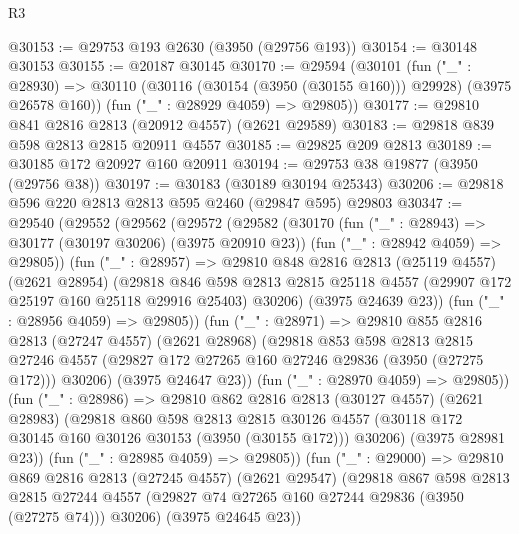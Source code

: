 \begin{lexlean}{R3}
\begin{coremodule}
@30153 := @29753 @193 @2630 (@3950 (@29756 @193))
@30154 := @30148 @30153
@30155 := @20187 @30145
@30170 := @29594
    (@30101
      (fun ("_" : @28930) =>
      @30110 (@30116 (@30154 (@3950 (@30155 @160))) @29928) (@3975 @26578 @160))
      (fun ("_" : @28929 @4059) => @29805))
@30177 := @29810 @841 @2816 @2813 (@20912 @4557) (@2621 @29589)
@30183 := @29818 @839 @598 @2813 @2815 @20911 @4557
@30185 := @29825 @209 @2813
@30189 := @30185 @172 @20927 @160 @20911
@30194 := @29753 @38 @19877 (@3950 (@29756 @38))
@30197 := @30183 (@30189 @30194 @25343)
@30206 := @29818 @596 @220 @2813 @2813 @595 @2460 (@29847 @595) @29803
@30347 := @29540
    (@29552
      (@29562
        (@29572
          (@29582
            (@30170
              (fun ("_" : @28943) => @30177 (@30197 @30206) (@3975 @20910 @23))
              (fun ("_" : @28942 @4059) => @29805))
            (fun ("_" : @28957) =>
            @29810
              @848
              @2816
              @2813
              (@25119 @4557)
              (@2621 @28954)
              (@29818
                @846
                @598
                @2813
                @2815
                @25118
                @4557
                (@29907 @172 @25197 @160 @25118 @29916 @25403)
                @30206)
              (@3975 @24639 @23))
            (fun ("_" : @28956 @4059) => @29805))
          (fun ("_" : @28971) =>
          @29810
            @855
            @2816
            @2813
            (@27247 @4557)
            (@2621 @28968)
            (@29818
              @853
              @598
              @2813
              @2815
              @27246
              @4557
              (@29827 @172 @27265 @160 @27246 @29836 (@3950 (@27275 @172)))
              @30206)
            (@3975 @24647 @23))
          (fun ("_" : @28970 @4059) => @29805))
        (fun ("_" : @28986) =>
        @29810
          @862
          @2816
          @2813
          (@30127 @4557)
          (@2621 @28983)
          (@29818
            @860
            @598
            @2813
            @2815
            @30126
            @4557
            (@30118 @172 @30145 @160 @30126 @30153 (@3950 (@30155 @172)))
            @30206)
          (@3975 @28981 @23))
        (fun ("_" : @28985 @4059) => @29805))
      (fun ("_" : @29000) =>
      @29810
        @869
        @2816
        @2813
        (@27245 @4557)
        (@2621 @29547)
        (@29818
          @867
          @598
          @2813
          @2815
          @27244
          @4557
          (@29827 @74 @27265 @160 @27244 @29836 (@3950 (@27275 @74)))
          @30206)
        (@3975 @24645 @23))

\end{coremodule}
\end{lexlean}
